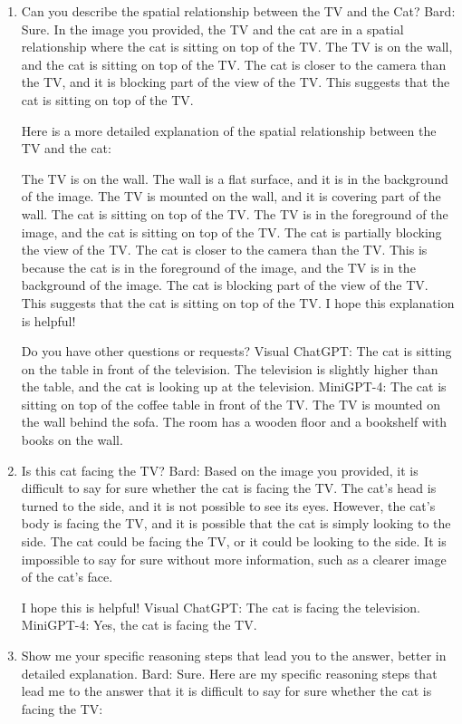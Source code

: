 \begin{enumerate}
    \item Can you describe the spatial relationship between the TV and the Cat?
    \subitem Bard: 
    Sure. In the image you provided, the TV and the cat are in a spatial relationship where the cat is sitting on top of the TV. The TV is on the wall, and the cat is sitting on top of the TV. The cat is closer to the camera than the TV, and it is blocking part of the view of the TV. This suggests that the cat is sitting on top of the TV.

    Here is a more detailed explanation of the spatial relationship between the TV and the cat:

    The TV is on the wall. The wall is a flat surface, and it is in the background of the image. The TV is mounted on the wall, and it is covering part of the wall.
    The cat is sitting on top of the TV. The TV is in the foreground of the image, and the cat is sitting on top of the TV. The cat is partially blocking the view of the TV.
    The cat is closer to the camera than the TV. This is because the cat is in the foreground of the image, and the TV is in the background of the image.
    The cat is blocking part of the view of the TV. This suggests that the cat is sitting on top of the TV.
    I hope this explanation is helpful!

    Do you have other questions or requests?
    \subitem Visual ChatGPT: The cat is sitting on the table in front of the television. The television is slightly higher than the table, and the cat is looking up at the television.
    \subitem MiniGPT-4: The cat is sitting on top of the coffee table in front of the TV. The TV is mounted on the wall behind the sofa. The room has a wooden floor and a bookshelf with books on the wall.
    \item Is this cat facing the TV?
    \subitem Bard: Based on the image you provided, it is difficult to say for sure whether the cat is facing the TV. The cat's head is turned to the side, and it is not possible to see its eyes. However, the cat's body is facing the TV, and it is possible that the cat is simply looking to the side. The cat could be facing the TV, or it could be looking to the side. It is impossible to say for sure without more information, such as a clearer image of the cat's face.

    I hope this is helpful!
    \subitem Visual ChatGPT: The cat is facing the television.
    \subitem MiniGPT-4: Yes, the cat is facing the TV.
    \item Show me your specific reasoning steps that lead you to the answer, better in detailed explanation.
    \subitem Bard: Sure. Here are my specific reasoning steps that lead me to the answer that it is difficult to say for sure whether the cat is facing the TV:


\end{enumerate}
